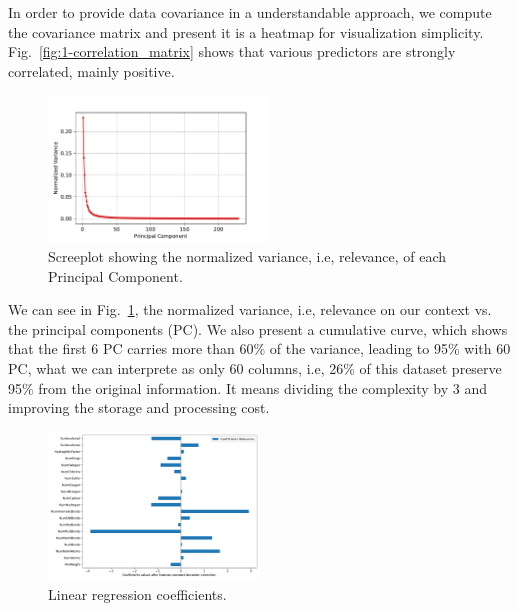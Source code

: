 In order to provide data covariance in a understandable approach, we compute the covariance matrix and present it is a heatmap for visualization simplicity. Fig.~\ref{fig:1-correlation_matrix} shows that various predictors are strongly correlated, mainly positive.

\begin{figure}[htbp!]
  \centerline{\includegraphics[width=0.52\textwidth]{../../code/hw2/figures/0-PCA-screeplot.pdf}}
  \caption{Screeplot showing the normalized variance, i.e, relevance, of each Principal Component.}
  \label{fig:0-PCA-screeplot}
\end{figure}

We can see in Fig.~\ref{fig:0-PCA-screeplot}, the normalized variance, i.e, relevance on our context vs. the principal components (PC). We also present a cumulative curve, which shows that the first 6 PC carries more than 60\% of the variance, leading to 95\% with 60 PC, what we can interprete as only 60 columns, i.e, 26\% of this dataset preserve 95\% from the original information. It means dividing the complexity by 3 and improving the storage and processing cost.


\begin{figure}[htbp!]
  \centerline{\includegraphics[width=0.5\textwidth]{../../code/hw2/figures/2-linear-regression-coefficients.pdf}}
  \caption{Linear regression coefficients.}
  \label{fig:2-linear-regression-coefficients}
\end{figure}



